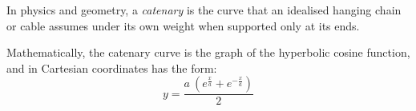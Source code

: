 \documentclass[11pt]{amsart}
\begin{document}
In physics and geometry, a \textit{catenary} is the curve that an idealised hanging chain or cable assumes under its own weight when supported only at its ends. %

Mathematically, the catenary curve is the graph of the hyperbolic cosine function, and in Cartesian coordinates has the form:
\begin{equation}
y = \frac{a \: (e^{\frac{x}{a}} + e^{-\frac{x}{a}})}{2}
\end{equation}

\end{document}
